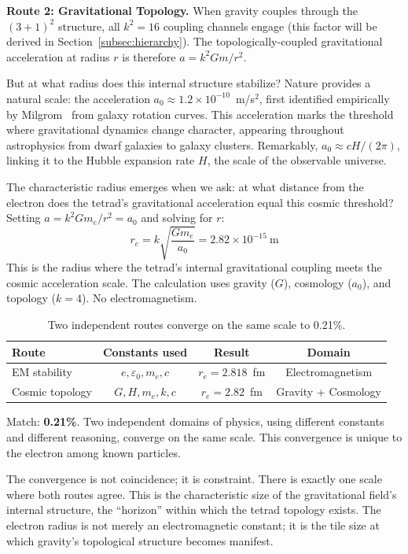 \documentclass[aps,prd,preprint,superscriptaddress,showpacs,preprintnumbers,amsmath,amssymb,nofootinbib]{revtex4-2}
\begin{document}
\textbf{Route 2: Gravitational Topology.} When gravity couples through the $(3+1)^2$ structure, all $k^2 = 16$ coupling channels engage (this factor will be derived in Section~\ref{subsec:hierarchy}). The topologically-coupled gravitational acceleration at radius $r$ is therefore $a = k^2 Gm/r^2$.

But at what radius does this internal structure stabilize? Nature provides a natural scale: the acceleration $a_0 \approx 1.2 \times 10^{-10}$~m/s$^2$, first identified empirically by Milgrom~\cite{milgrom1983} from galaxy rotation curves. This acceleration marks the threshold where gravitational dynamics change character, appearing throughout astrophysics from dwarf galaxies to galaxy clusters. Remarkably, $a_0 \approx cH/(2\pi)$, linking it to the Hubble expansion rate $H$, the scale of the observable universe.

The characteristic radius emerges when we ask: at what distance from the electron does the tetrad's gravitational acceleration equal this cosmic threshold? Setting $a = k^2 Gm_e/r^2 = a_0$ and solving for $r$:
\begin{equation}
r_e = k\sqrt{\frac{Gm_e}{a_0}} = 2.82 \times 10^{-15}~\text{m}
\end{equation}
This is the radius where the tetrad's internal gravitational coupling meets the cosmic acceleration scale. The calculation uses gravity ($G$), cosmology ($a_0$), and topology ($k = 4$). No electromagnetism.

\begin{table}[H]
\centering
\begin{tabular*}{0.95\textwidth}{@{\extracolsep{\fill}} lccc @{}}
\toprule
\textbf{Route} & \textbf{Constants used} & \textbf{Result} & \textbf{Domain} \\
\midrule
EM stability & $e, \varepsilon_0, m_e, c$ & $r_e = 2.818$~fm & Electromagnetism \\
Cosmic topology & $G, H, m_e, k, c$ & $r_e = 2.82$~fm & Gravity + Cosmology \\
\bottomrule
\end{tabular*}
\caption{Two independent routes converge on the same scale to 0.21\%.}
\label{tab:convergence}
\end{table}

Match: \textbf{0.21\%}. Two independent domains of physics, using different constants and different reasoning, converge on the same scale. This convergence is unique to the electron among known particles.

The convergence is not coincidence; it is constraint. There is exactly one scale where both routes agree. This is the characteristic size of the gravitational field's internal structure, the ``horizon'' within which the tetrad topology exists. The electron radius is not merely an electromagnetic constant; it is the tile size at which gravity's topological structure becomes manifest.
\end{document}
